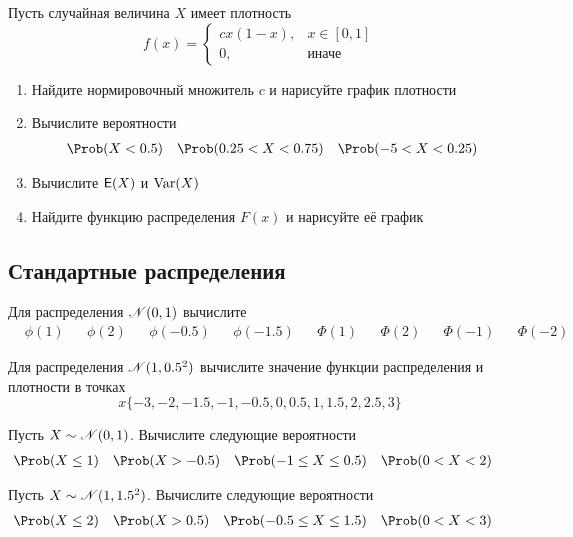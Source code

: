 \begin{exercise}
Пусть случайная величина \(X\) имеет плотность
\[
	f(x)=\begin{cases}
	cx(1-x), & x\in[0,1] \\ 0, & \text{иначе}
	\end{cases}
\]
\begin{enumerate}
	\item Найдите нормировочный множитель \(c\) и нарисуйте график плотности
	\item Вычислите вероятности
	\begin{align*}
		\Prob&(X<0.5) & \Prob&(0.25<X<0.75) & \Prob(-5<X<0.25)
	\end{align*}
	\item Вычислите \({\mathsf E}(X)\) и \(\operatorname{Var}(X)\)
	\item Найдите функцию распределения \(F(x)\) и нарисуйте её график
\end{enumerate}
\end{exercise}

\subsection{Стандартные распределения}

\begin{exercise}
Для распределения \({\mathscr N}(0,1)\) вычислите
\begin{align*}
	&\phi(1) & &\phi(2) & &\phi(-0.5) & &\phi(-1.5) & &\Phi(1) & &\Phi(2) & &\Phi(-1) & &\Phi(-2)
\end{align*}
\end{exercise}

\begin{exercise}
Для распределения \({\mathscr N}(1,0.5^2)\) вычислите значение функции распределения и плотности в точках
\[
	x\{-3, -2, -1.5, -1, -0.5, 0, 0.5, 1, 1.5, 2, 2.5, 3\}
\]
\end{exercise}

\begin{exercise}
Пусть \(X\sim{\mathscr N}(0,1)\). Вычислите следующие вероятности
\begin{align*}
	&\Prob(X\leq1) & &\Prob(X>-0.5) & 
	&\Prob(-1\leq X\leq0.5) & &\Prob(0<X<2)
\end{align*}
\end{exercise}

\begin{exercise}
Пусть \(X\sim{\mathscr N}(1,1.5^2)\). Вычислите следующие вероятности
\begin{align*}
	&\Prob(X\leq2) & &\Prob(X>0.5) & 
	&\Prob(-0.5\leq X\leq1.5) & &\Prob(0<X<3)
\end{align*}
\end{exercise}

